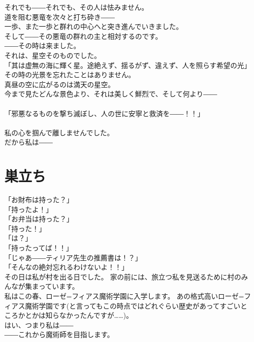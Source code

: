 \documentclass[oneside, a4paper]{jsbook}
\begin{document}
それでも――それでも、その人は怯みません。\\
道を阻む悪竜を次々と打ち砕き――\\
一歩、また一歩と群れの中心へと突き進んでいきました。\\

そして――その悪竜の群れの主と相対するのです。\\%
――その時は来ました。\\
それは、星空そのものでした。\\

\noindent
「其は虚無の海に輝く星。途絶えず、揺るがず、違えず、人を照らす希望の光」\\

その時の光景を忘れたことはありません。\\
真昼の空に広がるのは満天の星空。\\
今まで見たどんな景色より、それは美しく鮮烈で、そして何より――\\\\
「邪悪なるものを撃ち滅ぼし、人の世に安寧と救済を――！！」\\\\
私の心を掴んで離しませんでした。\\
だから私は――
\newpage
\section{巣立ち}

\noindent
「お財布は持った？」\\
「持ったよ！」\\
「お弁当は持った？」\\
「持った！」\\
「は？」\\
「持ったってば！！」\\
「じゃあ――ティリア先生の推薦書は！？」\\
「そんなの絶対忘れるわけないよ！！」\\

その日は私が村を出る日でした。
家の前には、旅立つ私を見送るために村のみんなが集まっています。\\
私はこの春、ローゼ=フィアス魔術学園に入学します。
あの格式高いローゼ=フィアス魔術学園です(と言ってもこの時点ではどれぐらい歴史があってすごいところかとかは知らなかったんですが……)。\\
はい、つまり私は――\\

――これから魔術師を目指します。\\
\end{document}
